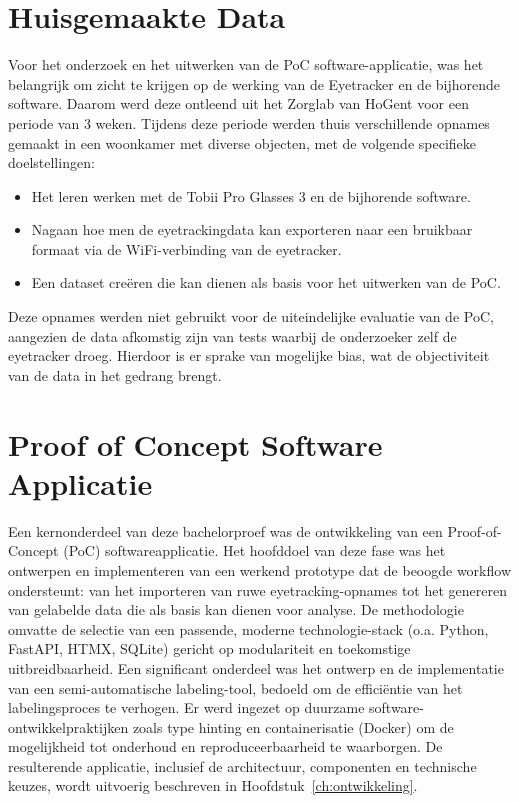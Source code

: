 \section{Huisgemaakte Data}

Voor het onderzoek en het uitwerken van de PoC software-applicatie, was het belangrijk om zicht te krijgen op de werking van de Eyetracker en de bijhorende software.
Daarom werd deze ontleend uit het Zorglab van HoGent voor een periode van 3 weken. 
Tijdens deze periode werden thuis verschillende opnames gemaakt in een woonkamer met diverse objecten, met de volgende specifieke doelstellingen:
\begin{itemize}
    \item Het leren werken met de Tobii Pro Glasses 3 en de bijhorende software.
    \item Nagaan hoe men de eyetrackingdata kan exporteren naar een bruikbaar formaat via de WiFi-verbinding van de eyetracker.
    \item Een dataset creëren die kan dienen als basis voor het uitwerken van de PoC.
\end{itemize}
Deze opnames werden niet gebruikt voor de uiteindelijke evaluatie van de PoC, aangezien de data afkomstig zijn van tests waarbij de onderzoeker zelf de eyetracker droeg.
Hierdoor is er sprake van mogelijke bias, wat de objectiviteit van de data in het gedrang brengt.

\section{Proof of Concept Software Applicatie}

Een kernonderdeel van deze bachelorproef was de ontwikkeling van een Proof-of-Concept (PoC) softwareapplicatie. 
Het hoofddoel van deze fase was het ontwerpen en implementeren van een werkend prototype dat de beoogde workflow ondersteunt: van het importeren van ruwe eyetracking-opnames tot het genereren van gelabelde data die als basis kan dienen voor analyse. 
De methodologie omvatte de selectie van een passende, moderne technologie-stack (o.a. Python, FastAPI, HTMX, SQLite) gericht op modulariteit en toekomstige uitbreidbaarheid. 
Een significant onderdeel was het ontwerp en de implementatie van een semi-automatische labeling-tool, bedoeld om de efficiëntie van het labelingsproces te verhogen. 
Er werd ingezet op duurzame software-ontwikkelpraktijken zoals type hinting en containerisatie (Docker) om de mogelijkheid tot onderhoud en reproduceerbaarheid te waarborgen. 
De resulterende applicatie, inclusief de architectuur, componenten en technische keuzes, wordt uitvoerig beschreven in Hoofdstuk~\ref{ch:ontwikkeling}.

